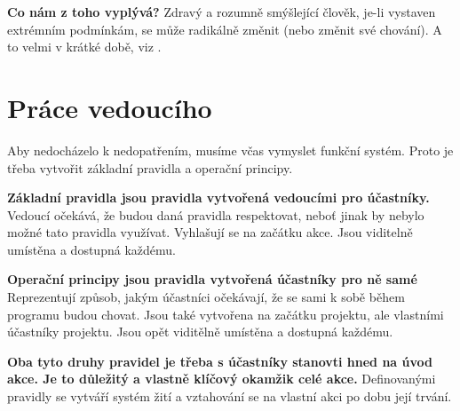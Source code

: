 \documentclass[a4paper,12pt,final]{report}
\begin{document}
\textbf{\Large \flushleft Co nám z toho vyplývá?} Zdravý a rozumně smýšlející člověk, je-li vystaven extrémním podmínkám, se může radikálně změnit (nebo změnit své chování). A to velmi v krátké době, viz .

\newpage
\pagelogos
\chapter{Práce vedoucího}
Aby nedocházelo k nedopatřením, musíme včas vymyslet funkční systém. Proto je třeba vytvořit základní pravidla a operační principy.

\textbf{Základní pravidla jsou pravidla vytvořená vedoucími pro účastníky.} 
Vedoucí očekává, že budou daná pravidla respektovat, neboť jinak by nebylo možné tato pravidla využívat. Vyhlašují se na začátku akce. Jsou viditelně umístěna a dostupná každému.

\textbf{Operační principy jsou pravidla vytvořená účastníky pro ně samé}
Reprezentují způsob, jakým účastníci očekávají, že se sami k sobě během programu budou chovat. Jsou také vytvořena na začátku projektu, ale vlastními účastníky projektu. Jsou opět viditělně umístěna a dostupná každému.

\textbf{Oba tyto druhy pravidel je třeba s účastníky stanovti hned na úvod akce. Je to důležitý a vlastně klíčový okamžik celé akce.}
Definovanými pravidly se vytváří systém žití a vztahování se na vlastní akci po dobu její trvání.
\end{document}
